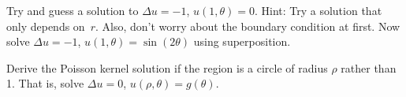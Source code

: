 \begin{exercise}
\leavevmode
\begin{tasks}
\task
Try and guess a solution to $\Delta u = -1$, $u(1,\theta) = 0$.
Hint: Try a solution that only depends on~$r$.  Also, don't worry
about the boundary condition at first.
\task
Now solve $\Delta u = -1$, $u(1,\theta) = \sin(2\theta)$ using
superposition.
\end{tasks}
\end{exercise}

\begin{exercise}[challenging]
Derive the Poisson kernel solution
if the region is a circle of radius $\rho$ rather
than 1.  That is, solve $\Delta u = 0$, $u(\rho,\theta) = g(\theta)$.
\end{exercise}
